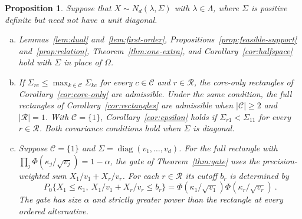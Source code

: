 \documentclass[11pt]{article}
\newcommand{\red}[1]{{\color{red}#1}} %
\numberwithin{equation}{section}
\newtheorem{proposition}{Proposition}
\theoremstyle{definition}
\begin{document}
\begin{proposition}\label{prop:covariance}
Suppose that $X\sim N_d(\lambda,\Sigma)$ with $\lambda\in\Lambda$, where $\Sigma$ is positive definite but need not have a unit diagonal.
\begin{enumerate}[(a)]
\item Lemmas~\ref{lem:dual} and~\ref{lem:first-order}, Propositions~\ref{prop:feasible-support} and~\ref{prop:relation}, Theorem~\ref{thm:one-extra}, and Corollary~\ref{cor:halfspace} hold with $\Sigma$ in place of $\Omega$.
\item \red{If $\Sigma_{rc}\le\max_{k\in\mathcal C}\Sigma_{kc}$ for every $c\in\mathcal C$ and $r\in\mathcal R$, the core-only rectangles of Corollary~\ref{cor:core-only} are admissible. Under the same condition, the full rectangles of Corollary~\ref{cor:rectangles} are admissible when $|\mathcal C|\ge2$ and $|\mathcal R|=1$. With $\mathcal C=\{1\}$, Corollary~\ref{cor:epsilon} holds if $\Sigma_{r1}<\Sigma_{11}$ for every $r\in\mathcal R$. Both covariance conditions hold when $\Sigma$ is diagonal.}
\item \red{Suppose $\mathcal C=\{1\}$ and $\Sigma=\operatorname{diag}(v_1,\dots,v_d)$. For the full rectangle with $\prod_j\Phi(\kappa_j/\sqrt{v_j})=1-\alpha$, the gate of Theorem~\ref{thm:gate} uses the precision-weighted sum $X_1/v_1+X_r/v_r$. For each $r\in\mathcal R$ its cutoff $b_r$ is determined by
\[
 P_0\{X_1\le\kappa_1,\ X_1/v_1+X_r/v_r\le b_r\}
 =\Phi(\kappa_1/\sqrt{v_1})\Phi(\kappa_r/\sqrt{v_r})~.
\]
The gate has size $\alpha$ and strictly greater power than the rectangle at every ordered alternative.}
\end{enumerate}
\end{proposition}
\end{document}
